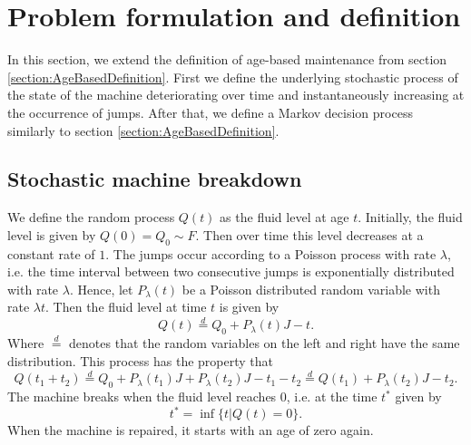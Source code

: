 \section{Problem formulation and definition}
In this section, we extend the definition of age-based maintenance from section \ref{section:AgeBasedDefinition}.
First we define the underlying stochastic process of the state of the machine deteriorating over time and instantaneously increasing at the occurrence of jumps.
After that, we define a Markov decision process similarly to section \ref{section:AgeBasedDefinition}.

\subsection{Stochastic machine breakdown}
We define the random process $Q(t)$ as the fluid level at age $t$.
Initially, the fluid level is given by $Q(0)=Q_0\sim F$.
Then over time this level decreases at a constant rate of $1$.
The jumps occur according to a Poisson process with rate $\lambda$, i.e. the time interval between two consecutive jumps is exponentially distributed with rate $\lambda$.
Hence, let $P_\lambda(t)$ be a Poisson distributed random variable with rate $\lambda t$.
Then the fluid level at time $t$ is given by 
\[
Q(t)\stackrel d=Q_0+P_\lambda(t)J-t.
\]
Where $\stackrel d=$ denotes that the random variables on the left and right have the same distribution.
This process has the property that
\[
Q(t_1+t_2)\stackrel d= Q_0+P_\lambda(t_1)J+P_\lambda(t_2)J-t_1-t_2\stackrel d= Q(t_1)+P_\lambda(t_2)J-t_2.
\]
The machine breaks when the fluid level reaches $0$, i.e. at the time $t^*$ given by
\[
t^*=\inf\{t|Q(t)=0\}.
\]
When the machine is repaired, it starts with an age of zero again.


